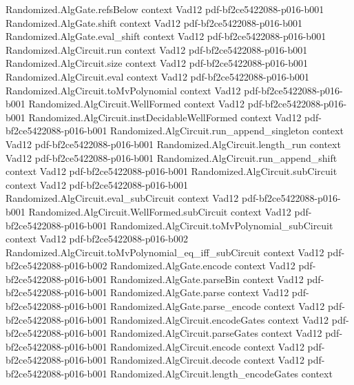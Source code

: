 \begin{theorem}
  {Randomized.AlgGate.refsBelow}
  {context}
  {Vad12}
  {pdf-bf2ce5422088-p016-b001}
\proofstep
  {Randomized.AlgGate.shift}
  {context}
  {Vad12}
  {pdf-bf2ce5422088-p016-b001}
\proofstep
  {Randomized.AlgGate.eval_shift}
  {context}
  {Vad12}
  {pdf-bf2ce5422088-p016-b001}
\proofstep
  {Randomized.AlgCircuit.run}
  {context}
  {Vad12}
  {pdf-bf2ce5422088-p016-b001}
\proofstep
  {Randomized.AlgCircuit.size}
  {context}
  {Vad12}
  {pdf-bf2ce5422088-p016-b001}
\proofstep
  {Randomized.AlgCircuit.eval}
  {context}
  {Vad12}
  {pdf-bf2ce5422088-p016-b001}
\proofstep
  {Randomized.AlgCircuit.toMvPolynomial}
  {context}
  {Vad12}
  {pdf-bf2ce5422088-p016-b001}
\proofstep
  {Randomized.AlgCircuit.WellFormed}
  {context}
  {Vad12}
  {pdf-bf2ce5422088-p016-b001}
\proofstep
  {Randomized.AlgCircuit.instDecidableWellFormed}
  {context}
  {Vad12}
  {pdf-bf2ce5422088-p016-b001}
\proofstep
  {Randomized.AlgCircuit.run_append_singleton}
  {context}
  {Vad12}
  {pdf-bf2ce5422088-p016-b001}
\proofstep
  {Randomized.AlgCircuit.length_run}
  {context}
  {Vad12}
  {pdf-bf2ce5422088-p016-b001}
\proofstep
  {Randomized.AlgCircuit.run_append_shift}
  {context}
  {Vad12}
  {pdf-bf2ce5422088-p016-b001}
\proofstep
  {Randomized.AlgCircuit.subCircuit}
  {context}
  {Vad12}
  {pdf-bf2ce5422088-p016-b001}
\proofstep
  {Randomized.AlgCircuit.eval_subCircuit}
  {context}
  {Vad12}
  {pdf-bf2ce5422088-p016-b001}
\proofstep
  {Randomized.AlgCircuit.WellFormed.subCircuit}
  {context}
  {Vad12}
  {pdf-bf2ce5422088-p016-b001}
\proofstep
  {Randomized.AlgCircuit.toMvPolynomial_subCircuit}
  {context}
  {Vad12}
  {pdf-bf2ce5422088-p016-b002}
\proofstep
  {Randomized.AlgCircuit.toMvPolynomial_eq_iff_subCircuit}
  {context}
  {Vad12}
  {pdf-bf2ce5422088-p016-b002}
\proofstep
  {Randomized.AlgGate.encode}
  {context}
  {Vad12}
  {pdf-bf2ce5422088-p016-b001}
\proofstep
  {Randomized.AlgGate.parseBin}
  {context}
  {Vad12}
  {pdf-bf2ce5422088-p016-b001}
\proofstep
  {Randomized.AlgGate.parse}
  {context}
  {Vad12}
  {pdf-bf2ce5422088-p016-b001}
\proofstep
  {Randomized.AlgGate.parse_encode}
  {context}
  {Vad12}
  {pdf-bf2ce5422088-p016-b001}
\proofstep
  {Randomized.AlgCircuit.encodeGates}
  {context}
  {Vad12}
  {pdf-bf2ce5422088-p016-b001}
\proofstep
  {Randomized.AlgCircuit.parseGates}
  {context}
  {Vad12}
  {pdf-bf2ce5422088-p016-b001}
\proofstep
  {Randomized.AlgCircuit.encode}
  {context}
  {Vad12}
  {pdf-bf2ce5422088-p016-b001}
\proofstep
  {Randomized.AlgCircuit.decode}
  {context}
  {Vad12}
  {pdf-bf2ce5422088-p016-b001}
\proofstep
  {Randomized.AlgCircuit.length_encodeGates}
  {context}

\end{theorem}

